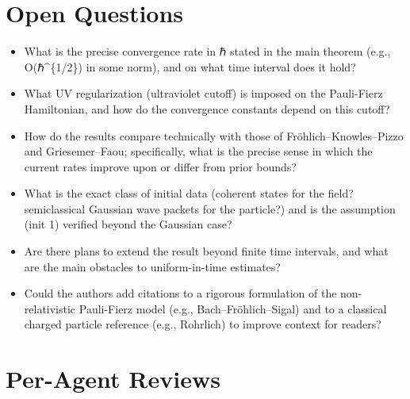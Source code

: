 \documentclass[11pt]{article}
\begin{document}
\section*{Open Questions}
\begin{itemize}[leftmargin=*]
  \item What is the precise convergence rate in ℏ stated in the main theorem (e.g., O(ℏ\^{}\{1/2\}) in some norm), and on what time interval does it hold?
  \item What UV regularization (ultraviolet cutoff) is imposed on the Pauli-Fierz Hamiltonian, and how do the convergence constants depend on this cutoff?
  \item How do the results compare technically with those of Fröhlich–Knowles–Pizzo and Griesemer–Faou; specifically, what is the precise sense in which the current rates improve upon or differ from prior bounds?
  \item What is the exact class of initial data (coherent states for the field? semiclassical Gaussian wave packets for the particle?) and is the assumption (init 1) verified beyond the Gaussian case?
  \item Are there plans to extend the result beyond finite time intervals, and what are the main obstacles to uniform-in-time estimates?
  \item Could the authors add citations to a rigorous formulation of the non-relativistic Pauli-Fierz model (e.g., Bach–Fröhlich–Sigal) and to a classical charged particle reference (e.g., Rohrlich) to improve context for readers?
\end{itemize}

\section*{Per-Agent Reviews}
\end{document}
